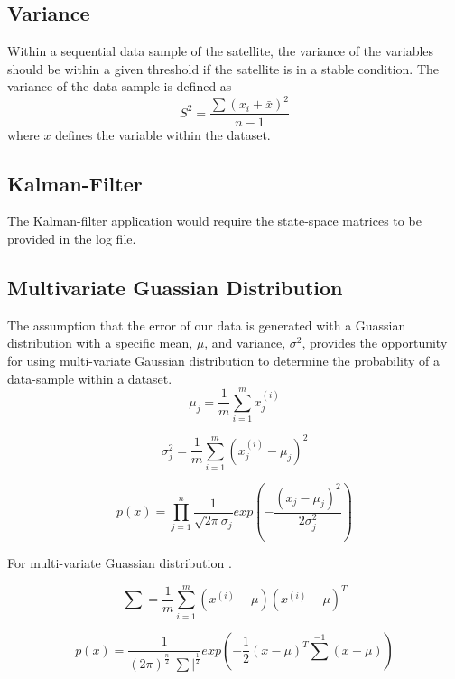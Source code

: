 \subsection{Variance}
Within a sequential data sample of the satellite, the variance of the variables should be within a given threshold if the satellite is in a stable condition. The variance of the data sample is defined as 
\begin{equation}
	S^2 = \frac{\sum(x_i + \bar{x})^2}{n-1}
\end{equation}
where $x$ defines the variable within the dataset.

\subsection{Kalman-Filter}
The Kalman-filter application would require the state-space matrices to be provided in the log file.

\subsection{Multivariate Guassian Distribution}
The assumption that the error of our data is generated with a Guassian distribution with a specific mean, $\mu$, and variance, $\sigma^2$, provides the opportunity for using multi-variate Gaussian distribution to determine the probability of a data-sample within a dataset. 
\begin{equation}
	\label{mean}
	\mu_j = \frac{1}{m} \sum_{i=1}^{m}x_j^{(i)}
\end{equation}

\begin{equation}
	\label{variance}
	\sigma_j^2 = \frac{1}{m} \sum_{i=1}^{m}(x_j^{(i)} - \mu_j)^2
\end{equation}

\begin{equation}
	\label{guassian distribution}
	p(x) = \prod_{j=1}^{n} \frac{1}{\sqrt{2\pi}\sigma_j}exp(-\frac{(x_j-\mu_j)^2}{2\sigma_j^2})
\end{equation}

For multi-variate Guassian distribution \cite{do2008multivariate}.

\begin{equation}
	\label{sum}
	\sum = \frac{1}{m}\sum_{i=1}^{m}(x^{(i)}-\mu)(x^{(i)}-\mu)^T
\end{equation}

\begin{equation}
	\label{multi-variate guassian distribution}
	p(x) = \frac{1}{(2\pi)^{\frac{n}{2}}{\lvert \sum \rvert}^\frac{1}{2}} exp(-\frac{1}{2}(x-\mu)^T{\sum}^{-1}(x-\mu))
\end{equation}

